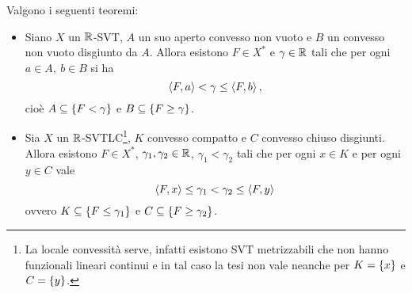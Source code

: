 \begin{theorem}\label{ThSeparazioneDiConvessi}
Valgono i seguenti teoremi:
\setlength{\leftmargini}{0cm}
\begin{itemize}
    \item Siano $X$ un $\mathbb{R}$-SVT, $A$ un suo aperto convesso non vuoto e $B$ un convesso non vuoto disgiunto da $A$. Allora esistono $F\in X^\ast$ e $\gamma\in \mathbb{R}$ tali che per ogni $a\in A,\ b\in B$ si ha
    \[\left\langle {F,a}\right\rangle<\gamma\leq\left\langle {F,b}\right\rangle,\]
    cio\`e $A\subseteq \left\{{F<\gamma}\right\}$ e $B\subseteq \left\{{F\geq \gamma}\right\}$.
    \item Sia $X$ un $\mathbb{R}$-SVTLC\footnote{La locale convessit\`a serve, infatti esistono SVT metrizzabili che non hanno funzionali lineari continui e in tal caso la tesi non vale neanche per $K=\left\{{x}\right\}$ e $C=\left\{{y}\right\}$.}, $K$ convesso compatto e $C$ convesso chiuso disgiunti. Allora esistono $F\in X^\ast$, $\gamma_1,\gamma_2\in\mathbb{R}$, $\gamma_1<\gamma_2$ tali che per ogni $x\in K$ e per ogni $y\in C$ vale
    \[\left\langle {F,x}\right\rangle\leq \gamma_1<\gamma_2\leq \left\langle {F,y}\right\rangle\]
    ovvero $K\subseteq \left\{{F\leq \gamma_1}\right\}$ e $C\subseteq \left\{{F\geq \gamma_2}\right\}$.
\end{itemize}
\setlength{\leftmargini}{0.5cm}
\end{theorem}

